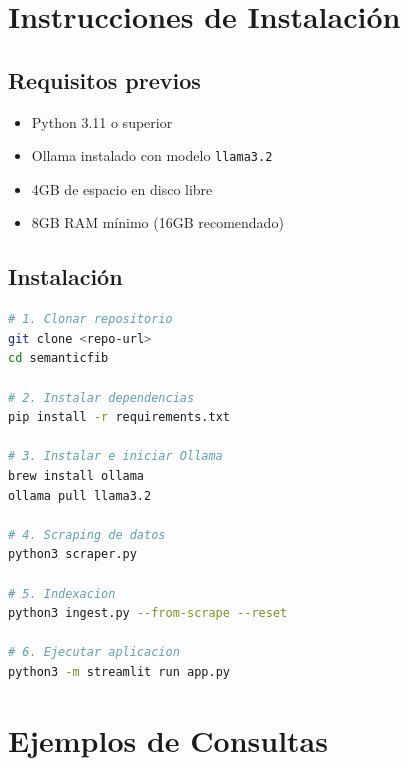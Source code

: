 \documentclass[12pt, a4paper, twoside]{report}
\begin{document}
\begin{appendices}

\chapter{Instrucciones de Instalaci\'on}
\label{app:instalacion}

\section{Requisitos previos}

\begin{itemize}
  \item Python 3.11 o superior
  \item Ollama instalado con modelo \texttt{llama3.2}
  \item 4GB de espacio en disco libre
  \item 8GB RAM m\'inimo (16GB recomendado)
\end{itemize}

\section{Instalaci\'on}

\begin{lstlisting}[language=bash, caption={Comandos de instalaci\'on}]
# 1. Clonar repositorio
git clone <repo-url>
cd semanticfib

# 2. Instalar dependencias
pip install -r requirements.txt

# 3. Instalar e iniciar Ollama
brew install ollama
ollama pull llama3.2

# 4. Scraping de datos
python3 scraper.py

# 5. Indexacion
python3 ingest.py --from-scrape --reset

# 6. Ejecutar aplicacion
python3 -m streamlit run app.py
\end{lstlisting}

\chapter{Ejemplos de Consultas}
\label{app:ejemplos}


\end{appendices}
\end{document}
